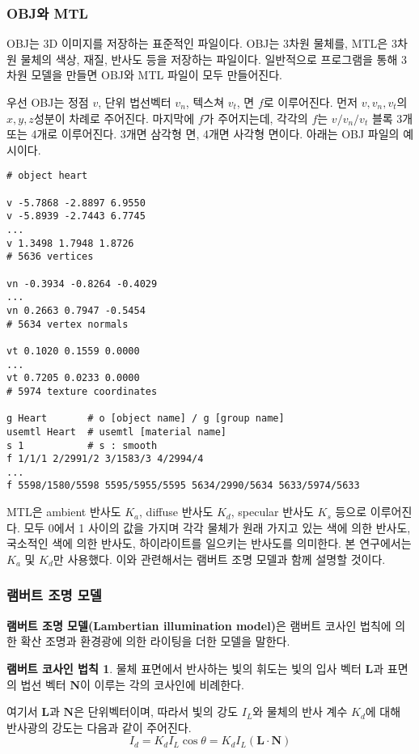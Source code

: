 \documentclass[10pt]{gshs-report-v2.0}
\theoremstyle{theorem}
\theoremstyle{lemma}
\theoremstyle{definition}
\newtheorem*{lambert}{램버트 코사인 법칙}
\begin{document}
\subsubsection{OBJ와 MTL}
OBJ는 3D 이미지를 저장하는 표준적인 파일이다. OBJ는 3차원 물체를, MTL은 3차원 물체의 색상, 재질, 반사도 등을 저장하는 파일이다. 일반적으로 프로그램을 통해 3차원 모델을 만들면 OBJ와 MTL 파일이 모두 만들어진다. 

우선 OBJ는 정점 $v$, 단위 법선벡터 $v_n$, 텍스쳐 $v_t$, 면 $f$로 이루어진다. 먼저 $v, v_n, v_t$의 $x, y, z$성분이 차례로 주어진다. 마지막에 $f$가 주어지는데, 각각의 $f$는 $v/v_n/v_t$ 블록 3개 또는 4개로 이루어진다. 3개면 삼각형 면, 4개면 사각형 면이다. 아래는 OBJ 파일의 예시이다. 
\begin{Verbatim}
# object heart

v -5.7868 -2.8897 6.9550
v -5.8939 -2.7443 6.7745
...
v 1.3498 1.7948 1.8726
# 5636 vertices

vn -0.3934 -0.8264 -0.4029
...
vn 0.2663 0.7947 -0.5454
# 5634 vertex normals

vt 0.1020 0.1559 0.0000
...
vt 0.7205 0.0233 0.0000
# 5974 texture coordinates

g Heart       # o [object name] / g [group name] 
usemtl Heart  # usemtl [material name]
s 1           # s : smooth
f 1/1/1 2/2991/2 3/1583/3 4/2994/4
...
f 5598/1580/5598 5595/5955/5595 5634/2990/5634 5633/5974/5633
\end{Verbatim}

MTL은 ambient 반사도 $K_a$, diffuse 반사도 $K_d$, specular 반사도 $K_s$ 등으로 이루어진다. 모두 0에서 1 사이의 값을 가지며 각각 물체가 원래 가지고 있는 색에 의한 반사도, 국소적인 색에 의한 반사도, 하이라이트를 일으키는 반사도를 의미한다. 본 연구에서는 $K_a$ 및 $K_d$만 사용했다. 이와 관련해서는 램버트 조명 모델과 함께 설명할 것이다.

\subsubsection{램버트 조명 모델}
\textbf{램버트 조명 모델(Lambertian illumination model)}은 램버트 코사인 법칙에 의한 확산 조명과 환경광에 의한 라이팅을 더한 모델을 말한다.\cite{lambertian model}
\begin{lambert}
	물체 표면에서 반사하는 빛의 휘도는 빛의 입사 벡터 $\mathbf{L}$과 표면의 법선 벡터 $\mathbf{N}$이 이루는 각의 코사인에 비례한다.
\end{lambert}

여기서 $\mathbf{L}$과 $\mathbf{N}$은 단위벡터이며, 따라서 빛의 강도 $I_L$와 물체의 반사 계수 $K_d$에 대해 반사광의 강도는 다음과 같이 주어진다. 
\begin{equation} \label{diffuse light}
	I_d=K_dI_L\cos\theta=K_dI_L(\mathbf{L}\cdot\mathbf{N})
\end{equation}
\end{document}
